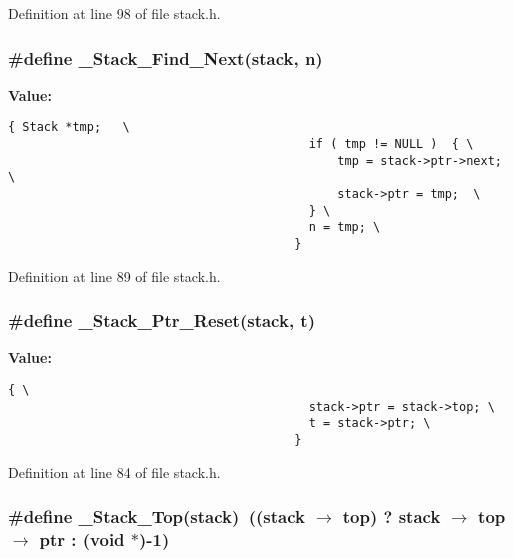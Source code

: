 Definition at line 98 of file stack.h.
\subsubsection{\setlength{\rightskip}{0pt plus 5cm}\#define \_\-Stack\_\-Find\_\-Next(\bf{stack}, n)}\label{stack_8h_fd76604b2baa55c0b6a9bdd49a265fcb}


\textbf{Value:}

\begin{Code}\begin{verbatim}{ Stack *tmp;   \
                                          if ( tmp != NULL )  { \
                                              tmp = stack->ptr->next; \
                                              stack->ptr = tmp;  \
                                          } \
                                          n = tmp; \
                                        }
\end{verbatim}\end{Code}


Definition at line 89 of file stack.h.
\subsubsection{\setlength{\rightskip}{0pt plus 5cm}\#define \_\-Stack\_\-Ptr\_\-Reset(\bf{stack}, t)}\label{stack_8h_57d892c55308c4d5b9cea8d5114825f6}


\textbf{Value:}

\begin{Code}\begin{verbatim}{ \
                                          stack->ptr = stack->top; \
                                          t = stack->ptr; \
                                        }
\end{verbatim}\end{Code}


Definition at line 84 of file stack.h.
\subsubsection{\setlength{\rightskip}{0pt plus 5cm}\#define \_\-Stack\_\-Top(\bf{stack})~((\bf{stack} $\rightarrow$ top) ? \bf{stack} $\rightarrow$ top $\rightarrow$ ptr : (void $\ast$)-1)}\label{stack_8h_f3b1fb3f91159582b3fce475d0d73b37}




